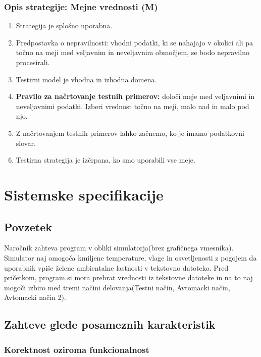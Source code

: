 \documentclass[a4paper,12pt]{article}
\begin{document}
		\subsubsection{Opis strategije: Mejne vrednosti (M)}
				
			\begin{enumerate}
			  		\item Strategija je splošno uporabna.
					\item Predpostavka o nepravilnosti: vhodni podatki, ki se nahajajo v okolici 
						  ali pa točno na meji med veljavnim in neveljavnim območjem, se bodo nepravilno procesirali.
					\item Testirni model je vhodna in izhodna domena.
					\item \textbf{Pravilo za načrtovanje testnih primerov:} določi meje med veljavnimi in neveljavnimi 
						  podatki. Izberi vrednost točno na meji, malo nad in malo pod njo.
					\item Z načrtovanjem testnih primerov lahko začnemo, ko je imamo podatkovni slovar.
					\item Testirna strategija je izčrpana, ko smo uporabili vse meje.	
			\end{enumerate}

\newpage

	\section{Sistemske specifikacije}
		
		\subsection{Povzetek}

			\qquad Naročnik zahteva program v obliki simulatorja(brez grafičnega vmesnika). 
			Simulator naj omogoča kmiljene temperature, vlage in osvetljenosti z pogojem 
			da uporabnik vpiše želene ambientalne lastnosti v tekstovno datoteko. 
			Pred pričetkom, program si mora prebrat vrednosti iz tekstovne datoteke 
			in na to naj mogoči izbiro med tremi načini delovanja(Testni način, Avtomacki način, Avtomacki način 2).

		\subsection{Zahteve glede posameznih karakteristik}

			\subsubsection{Korektnost oziroma funkcionalnost}
\end{document}
